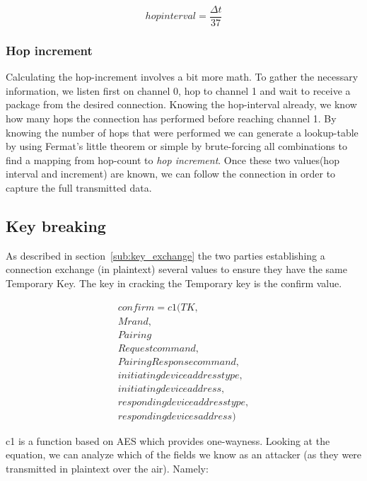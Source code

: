 \documentclass[conference]{IEEEtran}
\begin{document}
\begin{equation*}
  hopinterval = \frac{\Delta t}{37}
\end{equation*}

\subsubsection{Hop increment}
\label{ssub:hop_increment}

Calculating the hop-increment involves a bit more math. To gather the necessary information, we listen first on channel 0, hop to channel 1 and wait to receive a package from the desired connection. Knowing the hop-interval already, we know how many hops the connection has performed before reaching channel 1. By knowing the number of hops that were performed we can generate a lookup-table by using Fermat’s little theorem or simple by brute-forcing all combinations to find a mapping from hop-count to \emph{hop increment}. Once these two values(hop interval and increment) are known, we can follow the connection in order to capture the full transmitted data.

\subsection{Key breaking}

As described in section~\ref{sub:key_exchange} the two parties establishing a connection exchange (in plaintext) several values to ensure they have the same Temporary Key. The key in cracking the Temporary key is the confirm value.

\begin{equation*}
  \begin{split}
  confirm = c1 ( TK , \\Mrand , \\Pairing \\Request command, \\Pairing Response command, \\initiating device address type, \\initiating device address, \\responding device address type, \\responding devices address)
  \end{split}
\end{equation*}

c1 is a function based on AES which provides one-wayness.
Looking at the equation, we can analyze which of the fields we know as an attacker (as they were transmitted in plaintext over the air). Namely:
\end{document}
